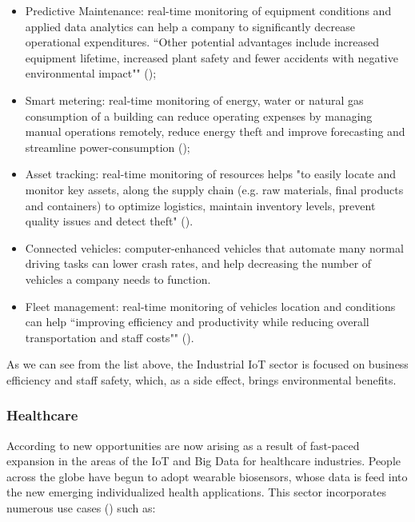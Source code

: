 \begin{itemize}
    \item Predictive Maintenance: real-time monitoring of equipment conditions and applied data analytics can help a company to significantly decrease operational expenditures. ``Other potential advantages include increased equipment lifetime, increased plant safety and fewer accidents with negative environmental impact"" (\cite{iiot-cases});
    \item Smart metering: real-time monitoring of energy, water or natural gas consumption of a building can reduce operating expenses by managing manual operations remotely, reduce energy theft and improve forecasting and streamline power-consumption (\cite{metering-sierra});
    \item Asset tracking: real-time monitoring of resources helps "to easily locate and monitor key assets, along the supply chain (e.g. raw materials, final products and containers) to optimize logistics, maintain inventory levels, prevent quality issues and detect theft" (\cite{iiot-cases}).
    \item Connected vehicles: computer-enhanced vehicles that automate many normal driving tasks can lower crash rates, and help decreasing the number of vehicles a company needs to function.
    \item Fleet management: real-time monitoring of vehicles location and conditions can help ``improving efficiency and productivity while reducing overall transportation and staff costs"" (\cite{iiot-cases}).
\end{itemize}

As we can see from the list above, the Industrial \gls{IoT} sector is focused on business efficiency and staff safety, which, as a side effect, brings environmental benefits.

\subsubsection{Healthcare}
\label{subsubsec:stateofart:iot:areas:healthcare}

According to \cite{FIROUZI2018583} new opportunities are now arising as a result of fast-paced expansion in the areas of the \gls{IoT} and Big Data for healthcare industries. People across the globe have begun to adopt wearable biosensors, whose data is feed into the new emerging individualized health applications.
This sector incorporates numerous use cases (\cite{iot-healthcare}) such as:

